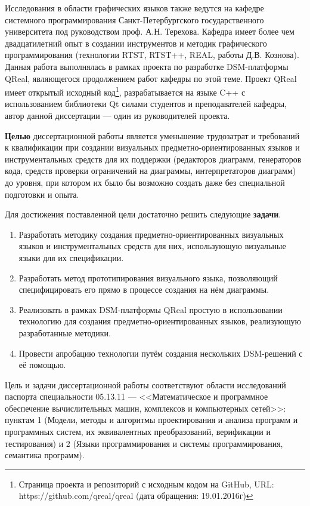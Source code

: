 Исследования в области графических языков также ведутся на кафедре системного программирования
Санкт-Петербургского государственного университета под руководством проф. А.Н. Терехова.
Кафедра имеет более чем двадцатилетний опыт в создании инструментов и методик графического
программирования (технологии RTST, RTST++, REAL, работы Д.В. Кознова). Данная работа 
выполнялась в рамках проекта по разработке DSM-платформы QReal, являющегося продолжением
работ кафедры по этой теме. Проект QReal имеет открытый исходный код\footnote{Страница 
проекта и репозиторий с исходным кодом на GitHub, URL: https://github.com/qreal/qreal (дата обращения: 19.01.2016г)}, 
разрабатывается на языке C++ с использованием библиотеки Qt силами студентов и преподавателей 
кафедры, автор данной диссертации --- один из руководителей проекта.

\textbf{Целью} диссертационной работы является уменьшение трудозатрат и требований к квалификации
при создании визуальных предметно-ориентированных языков и инструментальных средств для их поддержки 
(редакторов диаграмм, генераторов кода, средств проверки ограничений на диаграммы, интерпретаторов диаграмм)
до уровня, при котором их было бы возможно создать даже без специальной подготовки и опыта.

Для достижения поставленной цели достаточно решить следующие \textbf{задачи}.
\begin{enumerate}
	\item Разработать методику создания предметно-ориентированных визуальных языков и инструментальных 
		средств для них, использующую визуальные языки для их спецификации.
	\item Разработать метод прототипирования визуального языка, позволяющий специфицировать его
		прямо в процессе создания на нём диаграммы.
	\item Реализовать в рамках DSM-платформы QReal простую в использовании технологию 
		для создания предметно-ориентированных языков, реализующую разработанные методики.
	\item Провести апробацию технологии путём создания нескольких DSM-решений с её помощью.
\end{enumerate}

Цель и задачи диссертационной работы соответствуют области исследований паспорта специальности 
05.13.11 --- <<Математическое и программное обеспечение вычислительных машин, комплексов и компьютерных сетей>>: 
пунктам 1 (Модели, методы и алгоритмы проектирования и анализа программ и программных 
систем, их эквивалентных преобразований, верификации и тестирования) и 2 (Языки программирования 
и системы программирования, семантика программ).

